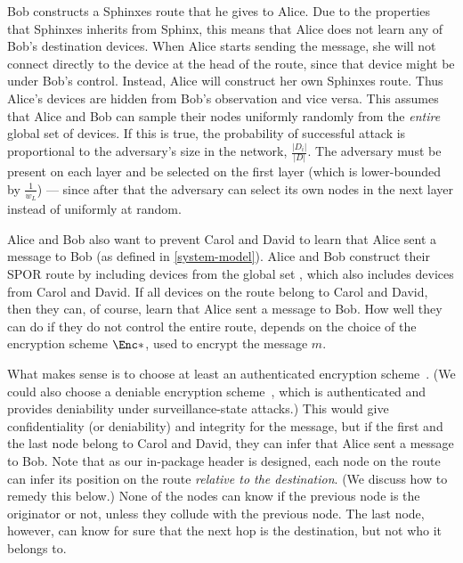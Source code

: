 Bob constructs a Sphinxes route that he gives to Alice.
Due to the properties that Sphinxes inherits from Sphinx, this means that Alice 
does not learn any of Bob's destination devices.
When Alice starts sending the message, she will not connect directly to the 
device at the head of the route, since that device might be under Bob's 
control.
Instead, Alice will construct her own Sphinxes route.
Thus Alice's devices are hidden from Bob's observation and vice versa.
This assumes that Alice and Bob can sample their nodes uniformly randomly from 
the \emph{entire} global set of devices.
If this is true, the probability of successful attack is proportional to the 
adversary's size in the network, \ie \(\frac{|D_i|}{|D|}\).
The adversary must be present on each layer and be selected on the first layer 
(which is lower-bounded by \(\frac{1}{w_L}\)) --- since after that the 
adversary can select its own nodes in the next layer instead of uniformly at 
random.

Alice and Bob also want to prevent Carol and David to learn that Alice sent a 
message to Bob (as defined in \cref{system-model}).
Alice and Bob construct their \ac{SPOR} route by including devices from the 
global set %
, which also includes devices from Carol and David.
If all devices on the route belong to Carol and David, then they can, of course, 
learn that Alice sent a message to Bob.
How well they can do if they do not control the entire route, depends on the 
choice of the encryption scheme \(\Enc*\), used to encrypt the message \(m\). 

What makes sense is to choose at least an authenticated encryption 
scheme~\cite{AuthEncryption}.
(We could also choose a deniable encryption scheme~\cite{DeniableEncryption}, 
\eg \cite{OTPKX} which is authenticated and provides deniability under
surveillance-state attacks.) %
This would give confidentiality (or deniability) and integrity for the message, 
but if the first and the last node belong to Carol and David, they can infer 
that Alice sent a message to Bob.
Note that as our in-package header is designed, each node on the route can infer 
its position on the route \emph{relative to the destination}.
(We discuss how to remedy this below.)
None of the nodes can know if the previous node is the originator or not, unless 
they collude with the previous node.
The last node, however, can know for sure that the next hop is the destination, 
but not who it belongs to.

